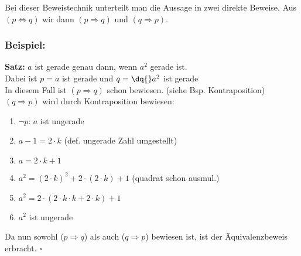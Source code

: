 \begin{framed} [Äquivalenzbeweis]
  Bei dieser Beweistechnik unterteilt man die Aussage in zwei direkte Beweise. Aus
  $(p \Leftrightarrow q)$ wir dann $(p \Rightarrow q)$ und $(q \Rightarrow p)$.

  \subsubsection*{Beispiel:}
  \textbf{Satz:} \dq{}$a$ ist gerade genau dann, wenn $a^2$ gerade ist\dq{}.\\
  Dabei ist $p = $\dq{}$a$ ist gerade\dq{} und $q = \dq{}a^2$ ist gerade\dq{}\\
  In diesem Fall ist $(p \Rightarrow q)$ schon bewiesen. (siehe Bsp. Kontraposition)\\
  $(q \Rightarrow p)$ wird durch Kontraposition bewiesen:
  \begin{enumerate}
    \item $\neg p$: \glqq $a$ ist ungerade\grqq
    \item $a - 1 = 2 \cdot k$ (def. ungerade Zahl umgestellt)
    \item $a = 2 \cdot k + 1$
    \item $a^2 = (2 \cdot k)^2 + 2 \cdot (2 \cdot k) + 1$ (quadrat schon ausmul.)
    \item $a^2 = 2 \cdot (2 \cdot k \cdot k + 2 \cdot k) + 1$
    \item $a^2$ ist ungerade
  \end{enumerate}
  Da nun sowohl ($p \Rightarrow q$) als auch ($q \Rightarrow p$) bewiesen ist, ist
  der Äquivalenzbeweis erbracht. $\square$
\end{framed}


